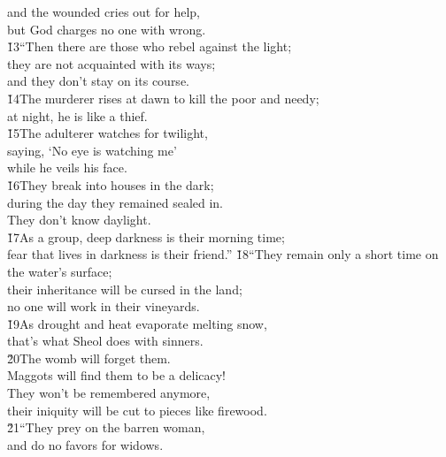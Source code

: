 \begin{poetry}
\poemll    and the wounded cries out for help, \\
\poemlll       but God charges no one with wrong. \\
\poeml \v{13}``Then there are those who rebel against the light; \\
\poemll    they are not acquainted with its ways; \\
\poemlll       and they don't stay on its course. \\
\poeml \v{14}The murderer rises at dawn to kill the poor and needy; \\
\poemll    at night, he is like a thief. \\
\poeml \v{15}The adulterer watches for twilight, \\
\poemll    saying, `No eye is watching me' \\
\poemlll       while he veils his face. \\
\poeml \v{16}They break into houses in the dark; \\
\poemll    during the day they remained sealed in. \\
\poemlll       They don't know daylight. \\
\poeml \v{17}As a group, deep darkness is their morning time; \\
\poemll    fear that lives in darkness is their friend.''
\poeml \v{18}``They remain only a short time on the water's surface; \\
\poemll    their inheritance will be cursed in the land; \\
\poemlll       no one will work in their vineyards. \\
\poeml \v{19}As drought and heat evaporate melting snow, \\
\poemll    that's what Sheol does with sinners. \\
\poeml \v{20}The womb will forget them. \\
\poemll    Maggots will find them to be a delicacy! \\
\poeml They won't be remembered anymore, \\
\poemll    their iniquity will be cut to pieces like firewood. \\
\poeml \v{21}``They prey on the barren woman, \\
\poemll    and do no favors for widows. \\

\end{poetry}
